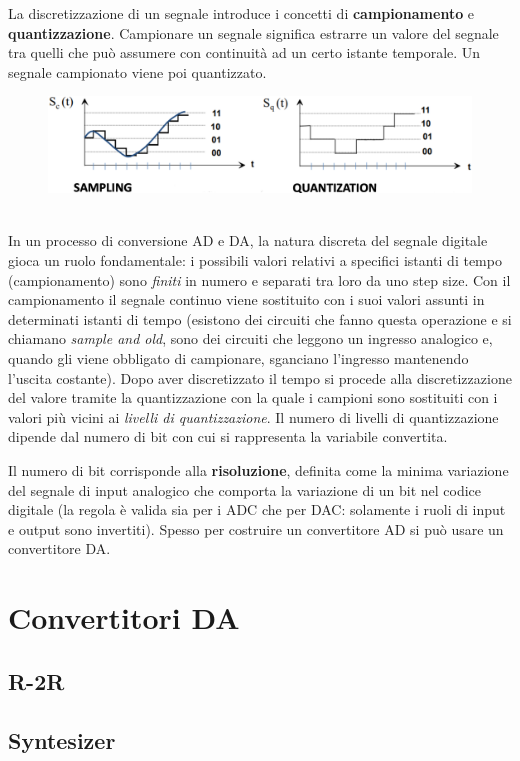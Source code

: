 \documentclass[12pt, a4paper]{report}
\begin{document}
La discretizzazione di un segnale introduce i concetti di \textbf{campionamento} e \textbf{quantizzazione}. Campionare un segnale significa estrarre un valore del segnale tra quelli che può assumere con continuità ad un certo istante temporale. Un segnale campionato viene poi quantizzato.
\begin{figure}[h]
    \centering
    \includegraphics[scale=0.4,angle=0]{sampl_quant.png}
\end{figure}
\\In un processo di conversione AD e DA, la natura discreta del segnale digitale gioca un ruolo fondamentale: i possibili valori relativi a specifici istanti di tempo (campionamento) sono \textit{finiti} in numero e separati tra loro da uno step size. Con il campionamento il segnale continuo viene sostituito con i suoi valori assunti in determinati istanti di tempo (esistono dei circuiti che fanno questa operazione e si chiamano \textit{sample and old}, sono dei circuiti che leggono un ingresso analogico e, quando gli viene obbligato di campionare, sganciano l'ingresso mantenendo l'uscita costante). Dopo aver discretizzato il tempo si procede alla discretizzazione del valore tramite la quantizzazione con la quale i campioni sono sostituiti con i valori più vicini ai \textit{livelli di quantizzazione}. Il numero di livelli di quantizzazione dipende dal numero di bit con cui si rappresenta la variabile convertita.

Il numero di bit corrisponde alla \textbf{risoluzione}, definita come la minima variazione del segnale di input analogico che comporta la variazione di un bit nel codice digitale (la regola è valida sia per i ADC che per DAC: solamente i ruoli di input e output sono invertiti).
\newpage
Spesso per costruire un convertitore AD si può usare un convertitore DA.
\section{Convertitori DA}
\subsection{R-2R}
\subsection{Syntesizer}
\end{document}
